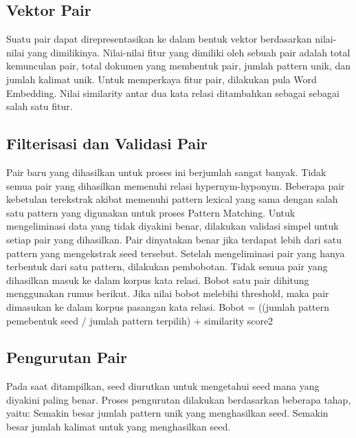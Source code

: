 \subsection{Vektor Pair}
Suatu pair dapat direpresentasikan ke dalam bentuk vektor berdasarkan nilai-nilai yang dimilikinya. Nilai-nilai fitur yang dimiliki oleh sebuah pair adalah total kemunculan pair, total dokumen yang membentuk pair, jumlah pattern unik, dan jumlah kalimat unik. Untuk memperkaya fitur pair, dilakukan pula Word Embedding. Nilai similarity antar dua kata relasi ditambahkan sebagai sebagai salah satu fitur.

\subsection{Filterisasi dan Validasi Pair}
Pair baru yang dihasilkan untuk proses ini berjumlah sangat banyak. Tidak semua pair yang dihasilkan memenuhi relasi hypernym-hyponym. Beberapa pair kebetulan terekstrak akibat memenuhi pattern lexical yang sama dengan salah satu pattern yang digunakan untuk proses Pattern Matching. Untuk mengeliminasi data yang tidak diyakini benar, dilakukan validasi simpel untuk setiap pair yang dihasilkan. Pair dinyatakan benar jika terdapat lebih dari satu pattern yang mengekstrak seed tersebut.
Setelah mengeliminasi pair yang hanya terbentuk dari satu pattern, dilakukan pembobotan. Tidak semua pair yang dihasilkan masuk ke dalam korpus kata relasi. Bobot satu pair dihitung menggunakan rumus berikut. Jika nilai bobot melebihi threshold, maka pair dimasukan ke dalam korpus pasangan kata relasi.
Bobot = ((jumlah pattern pemebentuk seed / jumlah pattern terpilih) + similarity score2

\subsection{Pengurutan Pair}
Pada saat ditampilkan, seed diurutkan untuk mengetahui seed mana yang diyakini paling benar. Proses pengurutan dilakukan berdasarkan beberapa tahap, yaitu:
Semakin besar jumlah pattern unik yang menghasilkan seed.
Semakin besar jumlah kalimat untuk yang menghasilkan seed.


